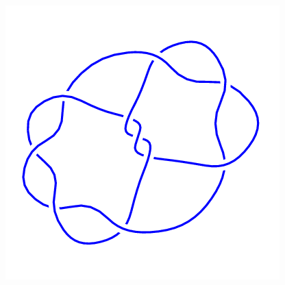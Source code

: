 \begin{figure}[H]
\begin{minipage}[b]{.18\linewidth}
    \end{minipage}
    \begin{minipage}[b]{.18\linewidth}
        \centering
        \includegraphics[width=\linewidth]{../data/10_61.png}
    \end{minipage}
\end{figure}
